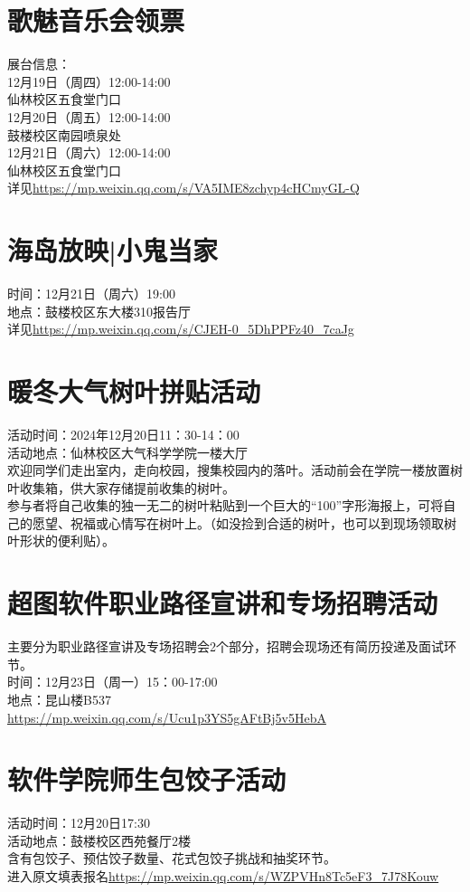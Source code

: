 \documentclass[letterpaper, 12pt]{article}
\begin{document}
\begin{multicols}{2}
\section{歌魅音乐会领票}
展台信息：\\
12月19日（周四）12:00-14:00\\
仙林校区五食堂门口\\
12月20日（周五）12:00-14:00\\
鼓楼校区南园喷泉处\\
12月21日（周六）12:00-14:00\\
仙林校区五食堂门口\\
详见\url{https://mp.weixin.qq.com/s/VA5IME8zchyp4cHCmyGL-Q}

\section{海岛放映|小鬼当家}
时间：12月21日（周六）19:00\\
地点：鼓楼校区东大楼310报告厅\\
详见\url{https://mp.weixin.qq.com/s/CJEH-0_5DhPPFz40_7caJg}

\section{暖冬大气树叶拼贴活动}
活动时间：2024年12月20日11：30-14：00\\
活动地点：仙林校区大气科学学院一楼大厅\\
欢迎同学们走出室内，走向校园，搜集校园内的落叶。活动前会在学院一楼放置树叶收集箱，供大家存储提前收集的树叶。\\
参与者将自己收集的独一无二的树叶粘贴到一个巨大的“100”字形海报上，可将自己的愿望、祝福或心情写在树叶上。（如没捡到合适的树叶，也可以到现场领取树叶形状的便利贴）。\\

\section{超图软件职业路径宣讲和专场招聘活动}
主要分为职业路径宣讲及专场招聘会2个部分，招聘会现场还有简历投递及面试环节。\\
时间：12月23日（周一）15：00-17:00\\
地点：昆山楼B537\\
\url{https://mp.weixin.qq.com/s/Ucu1p3YS5gAFtBj5v5HebA}


\section{软件学院师生包饺子活动}
活动时间：12月20日17:30\\
活动地点：鼓楼校区西苑餐厅2楼\\
含有包饺子、预估饺子数量、花式包饺子挑战和抽奖环节。\\
进入原文填表报名\url{https://mp.weixin.qq.com/s/WZPVHn8Tc5eF3_7J78Kouw}\\


\end{multicols}
\end{document}
